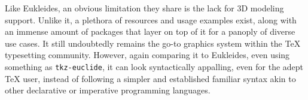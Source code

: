 Like Eukleides, an obvious limitation they share is the lack for 3D modeling
support.  Unlike it, a plethora of resources and usage examples exist, along
with an immense amount of packages that layer on top of it for a panoply of
diverse use cases.  It still undoubtedly remains the go-to graphics system
within the \TeX{} typesetting community.  However, again comparing it to
Eukleides, even using something as \texttt{tkz-euclide}, it can look
syntactically appalling, even for the adept \TeX{} user, instead of following a
simpler and established familiar syntax akin to other declarative or imperative
programming languages.
